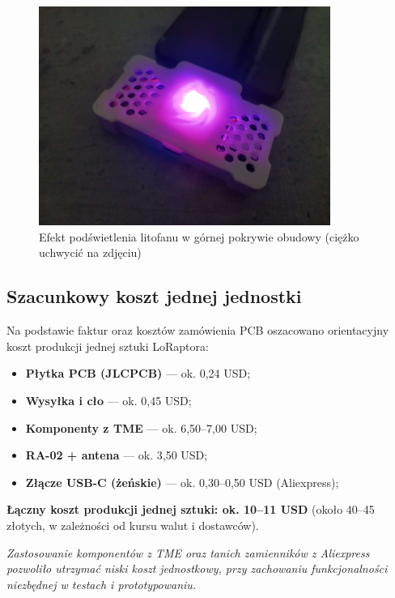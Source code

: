 \begin{figure}[htbp]
	\centering
	\includegraphics[width=0.85\textwidth]{root/litophane_test.jpg}
	\caption{Efekt podświetlenia litofanu w górnej pokrywie obudowy (ciężko uchwycić na zdjęciu)}
\end{figure}	

\clearpage
\subsection{Szacunkowy koszt jednej jednostki}

Na podstawie faktur oraz kosztów zamówienia PCB oszacowano orientacyjny koszt produkcji jednej sztuki LoRaptora:
\begin{itemize}
	\item \textbf{Płytka PCB (JLCPCB)} — ok. 0,24 USD;
	\item \textbf{Wysyłka i cło} — ok. 0,45 USD;
	\item \textbf{Komponenty z TME} — ok. 6,50–7,00 USD;
	\item \textbf{RA-02 + antena} — ok. 3,50 USD;
	\item \textbf{Złącze USB-C (żeńskie)} — ok. 0,30–0,50 USD (Aliexpress);
\end{itemize}
\textbf{Łączny koszt produkcji jednej sztuki: ok. 10–11 USD}  
(około 40–45 złotych, w zależności od kursu walut i dostawców).

\begin{tcolorbox}[
	colback=gray!5!white, 
	colframe=gray!75!black, 
	boxrule=0.8pt, 
	arc=5pt,
	enhanced,
	drop shadow,
	top=8pt,
	bottom=8pt,
	center
]
\textit{Zastosowanie komponentów z TME oraz tanich zamienników z Aliexpress pozwoliło utrzymać niski koszt jednostkowy, przy zachowaniu funkcjonalności niezbędnej w testach i prototypowaniu.}
\end{tcolorbox}